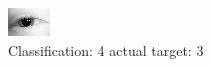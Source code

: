 \begin{figure}[h!]
\begin{center}
\includegraphics[width=0.60\columnwidth]{figures/ID67_class_4_target_3.png}
\end{center}
\caption{ Classification: 4 actual target: 3}
\label{fig:ID67_class_4_target_3}
\end{figure}
